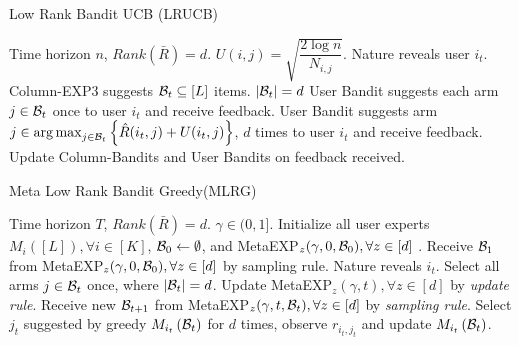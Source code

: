 \begin{algorithm}[!th]
\caption{Low Rank Bandit UCB (LRUCB)}
\label{alg:mLRBS2}
\begin{algorithmic}[1]
 Time horizon $n$, $Rank(\bar{R}) = d$.
 $U(i,j) = \sqrt{\dfrac{2\log n}{N_{i,j}}}$.
\State Nature reveals user $i_t$.  
\State Column-EXP3 suggests $\mathcal{B}_t\subseteq [L]$ items. $|\mathcal{B}_t| = d$
	 
\State User Bandit suggests each arm $j\in\mathcal{B}_t$ once to user $i_t$ and receive feedback.
\Else {}
\State User Bandit suggests arm $j\in \mathop{\rm arg\,max}_{j\in\mathcal{B}_t}\left\lbrace \hat{R}(i_t,j) + U(i_t,j)\right\rbrace$, $d$ times to user $i_t$ and receive feedback.
\EndIf
\State Update Column-Bandits and User Bandits on feedback received.
\EndFor
\end{algorithmic}
\end{algorithm}



\begin{algorithm}[!th]
\caption{Meta Low Rank Bandit Greedy(MLRG)}
\label{alg:mLRBG}
\begin{algorithmic}[1]
 Time horizon $T$, $Rank(\bar{R}) = d$.
 $\gamma \in (0,1]$.
 Initialize all user experts $M_{i}\left( [L]\right), \forall i\in [K]$,  $\mathcal{B}_0\leftarrow \emptyset$, and MetaEXP$_{z}(\gamma, 0, \mathcal{B}_0),\forall z\in[d]$ .
\State Receive $\mathcal{B}_1$ from MetaEXP$_z(\gamma, 0, \mathcal{B}_0),\forall z\in[d]$ by sampling rule.
\State Nature reveals $i_t$.  
\State Select all arms $j\in \mathcal{B}_t$ once, where $|\mathcal{B}_t| = d$.
\State Update MetaEXP$_{z}(\gamma, t),\forall z\in[d]$ by
\textit{update rule}. 
\State Receive new $\mathcal{B}_{t+1}$ from MetaEXP$_z(\gamma, t, \mathcal{B}_t),\forall z\in[d]$ by \textit{sampling rule}.
\EndFor
{} 
\State Select $j_t$ suggested by greedy $M_{i_t}\left( \mathcal{B}_t \right)$ for $d$ times, observe $r_{i_t,j_t}$ and update $M_{i_t}\left( \mathcal{B}_t \right)$. 
\EndFor
\EndFor
\end{algorithmic}
\end{algorithm}







